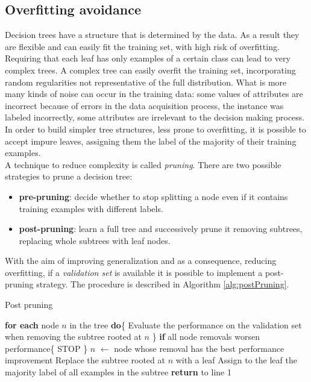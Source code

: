 \subsection{Overfitting avoidance}
Decision trees have a structure that is determined by the data. As a result they
are flexible and can easily fit the training set, with high risk of overfitting.\\
Requiring that each leaf has only examples of a certain class can lead to very
complex trees. A complex tree can easily overfit the training set, incorporating
random regularities not representative of the full distribution. What is more many
kinds of noise can occur in the training data: some values of attributes are
incorrect because of errors in the data acquisition process, the instance was labeled
incorrectly, some attributes are irrelevant to the decision making process. In order
to build simpler tree structures, less prone to overfitting, it is possible to accept
impure leaves, assigning them the label of the majority of their training
examples.\\ A technique to reduce complexity is called \textit{pruning}. There
are two possible strategies to prune a decision tree:
\begin{itemize}
	\item \textbf{pre-pruning}: decide whether to stop splitting a node even if it
		contains training examples with different labels.

	\item \textbf{post-pruning}: learn a full tree and successively prune it removing
		subtrees, replacing whole subtrees with leaf nodes.
\end{itemize}

With the aim of improving generalization and as a consequence, reducing overfitting,
if a \textit{validation set} is available it is possible to implement a post-pruning
strategy. The procedure is described in Algorithm \ref{alg:postPruning}.

\begin{algorithm}
	\caption{Post pruning \label{alg:postPruning}}
	\begin{algorithmic}
		[1] \STATE \textbf{for each} node $n$ in the tree \textbf{do}\{ \STATE \tab
		Evaluate the performance on the validation set \STATE \tab when removing the
		subtree rooted at $n$ \STATE \} \STATE \textbf{if} all node removals worsen performance\{
		\STATE \tab STOP \STATE \} \STATE \STATE $n$ $\leftarrow$ node whose removal
		has the best performance improvement \STATE \STATE Replace the subtree
		rooted at $n$ with a leaf \STATE \STATE Assign to the leaf the majority
		label of all examples in the subtree \STATE \STATE \textbf{return} to line 1
	\end{algorithmic}
\end{algorithm}

